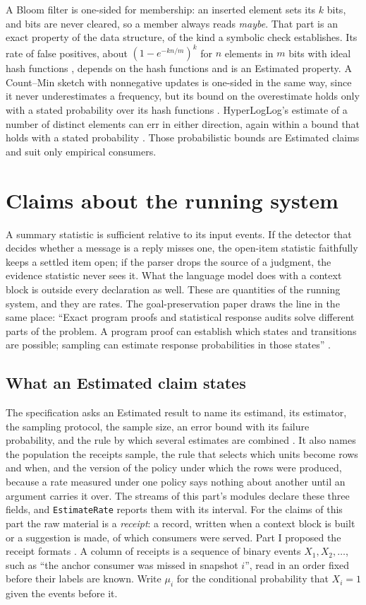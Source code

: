 \documentclass[11pt]{article}
\newcommand{\code}[1]{\texttt{#1}}
\theoremstyle{definition}
\theoremstyle{plain}
\begin{document}
A Bloom filter is one-sided for membership: an inserted element sets its $k$ bits, and bits are
never cleared, so a member always reads \emph{maybe}. That part is an exact property of the data
structure, of the kind a symbolic check establishes. Its rate of false positives, about $(1-e^{-kn/m})^k$ for $n$ elements in $m$ bits with
ideal hash functions \cite{bloom}, depends on the hash functions and is an Estimated property.
A Count--Min sketch with nonnegative updates is one-sided in the same way, since it never
underestimates a frequency, but its bound on the overestimate holds only with a stated probability
over its hash functions \cite{countmin}. HyperLogLog's estimate of a number of distinct elements
can err in either direction, again within a bound that holds with a stated probability \cite{hll}.
Those probabilistic bounds are Estimated claims and suit only empirical consumers.
\section{Claims about the running system}\label{sec:estimates}

A summary statistic is sufficient relative to its input events. If the detector that decides
whether a message is a reply misses one, the open-item statistic faithfully keeps a settled item
open; if the parser drops the source of a judgment, the evidence statistic never sees it. What the
language model does with a context block is outside every declaration as well. These are quantities
of the running system, and they are rates. The goal-preservation paper draws the line in the same
place: ``Exact program proofs and statistical response audits solve different parts of the problem.
A program proof can establish which states and transitions are possible; sampling can estimate
response probabilities in those states'' \cite[Section~6]{goalpres}.

\subsection{What an Estimated claim states}

The specification asks an Estimated result to name its estimand, its estimator, the sampling
protocol, the sample size, an error bound with its failure probability, and the rule by which
several estimates are combined \cite[Section~7.4]{spec}. It also names the population the receipts
sample, the rule that selects which units become rows and when, and the version of the policy under
which the rows were produced, because a rate measured under one policy says nothing about another
until an argument carries it over. The streams of this part's modules declare these three fields,
and \code{EstimateRate} reports them with its interval. For the claims of this part the raw material
is a \emph{receipt}: a record, written when a context block is built or a suggestion is made, of
which consumers were served. Part I proposed the receipt formats \cite[Appendix~C]{part1}. A column
of receipts is a sequence of binary events $X_1,X_2,\ldots$, such as ``the anchor consumer was missed
in snapshot $i$'', read in an order fixed before their labels are known. Write $\mu_i$ for the
conditional probability that $X_i=1$ given the events before it.
\end{document}
